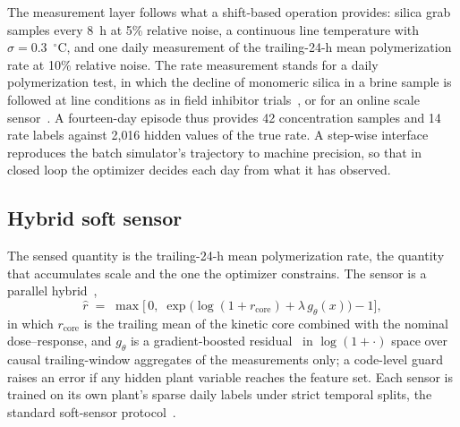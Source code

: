 The measurement layer follows what a shift-based operation provides:
silica grab samples every 8~h at 5\% relative noise, a continuous line
temperature with $\sigma = 0.3$~$^{\circ}$C, and one daily measurement
of the trailing-24-h mean polymerization rate at 10\% relative noise.
The rate measurement stands for a daily polymerization test, in which
the decline of monomeric silica in a brine sample is followed at line
conditions as in field inhibitor trials~\citep{baltazar2014grc}, or for
an online scale sensor~\citep{okazaki2017fiber}. A fourteen-day episode
thus provides 42 concentration samples and 14 rate labels against
2{,}016 hidden values of the true rate. A step-wise interface reproduces
the batch simulator's trajectory to machine precision, so that in
closed loop the optimizer decides each day from what it has observed.

\subsection{Hybrid soft sensor}\label{sec:sensor}

The sensed quantity is the trailing-24-h mean polymerization rate, the
quantity that accumulates scale and the one the optimizer constrains.
The sensor is a parallel hybrid~\citep{thompson1994modeling,%
vonstosch2014hybrid},
\begin{equation}\label{eq:sensor}
\hat r \;=\; \max\!\Big[\,0,\;
\exp\!\big(\log(1{+}r_{\mathrm{core}}) + \lambda\, g_{\theta}(x)\big) - 1
\Big],
\end{equation}
in which $r_{\mathrm{core}}$ is the trailing mean of the kinetic core
combined with the nominal dose--response, and $g_{\theta}$ is a
gradient-boosted residual~\citep{ke2017lightgbm} in $\log(1{+}\cdot)$
space over causal trailing-window aggregates of the measurements only;
a code-level guard raises an error if any hidden plant variable reaches
the feature set. Each sensor is trained on its own plant's sparse daily
labels under strict temporal splits, the standard soft-sensor
protocol~\citep{kadlec2009data}.

